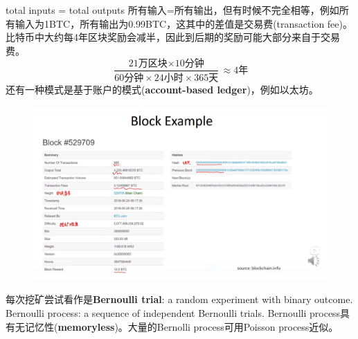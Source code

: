 \documentclass[10pt]{ctexart}
\begin{document}
total inputs = total outputs 所有输入=所有输出，但有时候不完全相等，例如所有输入为1BTC，所有输出为0.99BTC，这其中的差值是交易费(transaction fee)。比特币中大约每4年区块奖励会减半，因此到后期的奖励可能大部分来自于交易费。
$$
\frac{\text{21万区块}\times\text{10分钟}}{\text{60分钟}\times\text{24小时}\times\text{365天}} \approx \text{4年}
$$
还有一种模式是基于账户的模式(\textbf{account-based ledger})，例如以太坊。
\begin{figure}[H]
    \centering
    \includegraphics[width=1\textwidth]{./lecture5/img2.png} 
\end{figure}
 
 
 
每次挖矿尝试看作是\textbf{Bernoulli trial}: a random experiment with binary outcome. Bernoulli process: a sequence of independent Bernoulli trials. Bernoulli process具有无记忆性(\textbf{memoryless})。大量的Bernolli process可用Poisson process近似。
\end{document}
